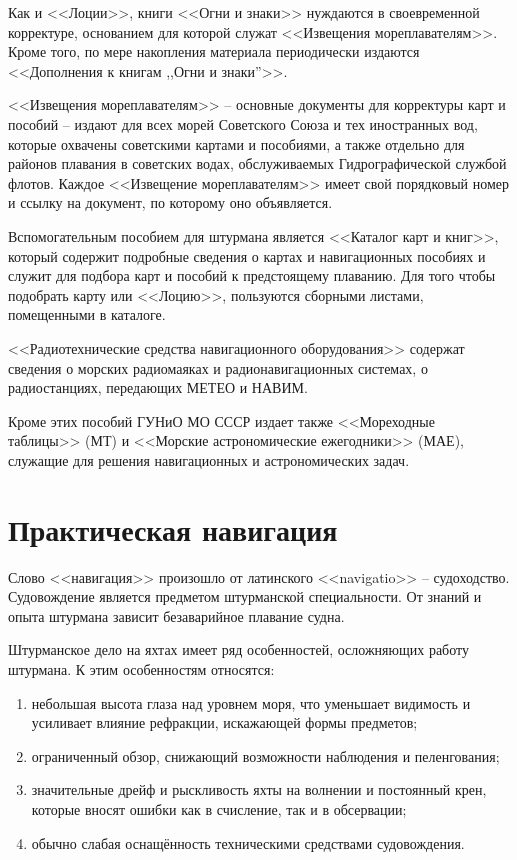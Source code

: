\documentclass[a4paper, 12pt, twoside, final, book, russian, fittopage, cyremdash]{ncc}
\begin{document}
Как и <<Лоции>>, книги <<Огни и знаки>> нуждаются в своевременной корректуре, основанием для которой служат <<Извещения мореплавателям>>. Кроме того, по мере накопления материала периодически издаются <<Дополнения к книгам ,,Огни и знаки''>>. 

<<Извещения мореплавателям>> \--- основные документы для корректуры карт и пособий \--- издают для всех морей Советского Союза и тех иностранных вод, которые охвачены советскими картами и пособиями, а также отдельно для районов плавания в советских водах, обслуживаемых Гидрографической службой флотов. Каждое <<Извещение мореплавателям>> имеет свой порядковый номер и ссылку на документ, по которому оно объявляется. 

Вспомогательным пособием для штурмана является <<Каталог карт и книг>>, который содержит подробные сведения о картах и навигационных пособиях и служит для подбора карт и пособий к предстоящему плаванию. Для того чтобы подобрать карту или <<Лоцию>>, пользуются сборными листами, помещенными в каталоге. 

<<Радиотехнические средства навигационного оборудования>> содержат сведения о морских радиомаяках и радионавигационных системах, о радиостанциях, передающих МЕТЕО и НАВИМ. 

Кроме этих пособий ГУНиО МО СССР издает также <<Мореходные таблицы>> (МТ) и <<Морские астрономические ежегодники>> (МАЕ), служащие для решения навигационных и астрономических задач.

\chapter{Практическая навигация}

Слово <<навигация>> произошло от латинского <<navigatio>> \--- судоходство. Судовождение является предметом штурманской специальности. От знаний и опыта штурмана зависит безаварийное плавание судна.

Штурманское дело на яхтах имеет ряд особенностей, осложняющих работу штурмана. К этим особенностям относятся: 
\begin{enumerate}
\item небольшая высота глаза над уровнем моря, что уменьшает видимость и усиливает влияние рефракции, искажающей формы предметов; 
\item ограниченный обзор, снижающий возможности наблюдения и пеленгования; 
\item значительные дрейф и рыскливость яхты на волнении и постоянный крен, которые вносят ошибки как в счисление, так и в обсервации; 
\item обычно слабая оснащённость техническими средствами судовождения. 
\end{enumerate}
\end{document}
